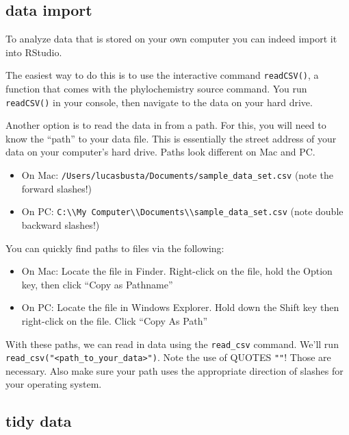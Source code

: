 \documentclass[
]{krantz}
\providecommand{\tightlist}{%
  \setlength{\itemsep}{0pt}\setlength{\parskip}{0pt}}
\begin{document}
\hypertarget{data-import}{%
\subsection{data import}\label{data-import}}

To analyze data that is stored on your own computer you can indeed import it into RStudio.

The easiest way to do this is to use the interactive command \texttt{readCSV()}, a function that comes with the phylochemistry source command. You run \texttt{readCSV()} in your console, then navigate to the data on your hard drive.

Another option is to read the data in from a path. For this, you will need to know the ``path'' to your data file. This is essentially the street address of your data on your computer's hard drive. Paths look different on Mac and PC.

\begin{itemize}
\tightlist
\item
  On Mac: \texttt{/Users/lucasbusta/Documents/sample\_data\_set.csv} (note the forward slashes!)
\item
  On PC: \texttt{C:\textbackslash{}\textbackslash{}My\ Computer\textbackslash{}\textbackslash{}Documents\textbackslash{}\textbackslash{}sample\_data\_set.csv} (note double backward slashes!)
\end{itemize}

You can quickly find paths to files via the following:

\begin{itemize}
\tightlist
\item
  On Mac: Locate the file in Finder. Right-click on the file, hold the Option key, then click ``Copy as Pathname''
\item
  On PC: Locate the file in Windows Explorer. Hold down the Shift key then right-click on the file. Click ``Copy As Path''
\end{itemize}

With these paths, we can read in data using the \texttt{read\_csv} command. We'll run \texttt{read\_csv("\textless{}path\_to\_your\_data\textgreater{}")}. Note the use of QUOTES \texttt{""}! Those are necessary. Also make sure your path uses the appropriate direction of slashes for your operating system.

\hypertarget{tidy-data}{%
\subsection{tidy data}\label{tidy-data}}
\end{document}
